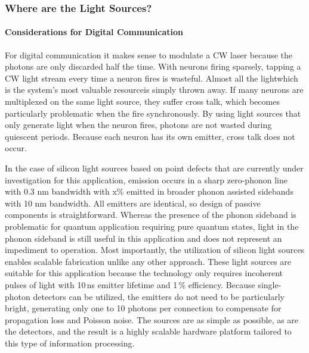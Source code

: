 \subsubsection{Where are the Light Sources?}

\paragraph{Considerations for Digital Communication}
\vspace{3em}
For digital communication it makes sense to modulate a CW laser because the photons are only discarded half the time. With neurons firing sparsely, tapping a CW light stream every time a neuron fires is wasteful. Almost all the light\textemdash which is the system's most valuable resource\textemdash is simply thrown away. If many neurons are multiplexed on the same light source, they suffer cross talk, which becomes particularly problematic when the fire synchronously. By using light sources that only generate light when the neuron fires, photons are not wasted during quiescent periods. Because each neuron has its own emitter, cross talk does not occur. 

In the case of silicon light sources based on point defects that are currently under investigation for this application, emission occurs in a sharp zero-phonon line with 0.3 nm bandwidth with x\% emitted in broader phonon assisted sidebands with 10 nm bandwidth. All emitters are identical, so design of passive components is straightforward. Whereas the presence of the phonon sideband is problematic for quantum application requiring pure quantum states, light in the phonon sideband is still useful in this application and does not represent an impediment to operation. Most importantly, the utilization of silicon light sources enables scalable fabrication unlike any other approach. These light sources are suitable for this application because the technology only requires incoherent pulses of light with 10\,ns emitter lifetime and 1\,\% efficiency. Because single-photon detectors can be utilized, the emitters do not need to be particularly bright, generating only one to 10 photons per connection to compensate for propagation loss and Poisson noise. The sources are as simple as possible, as are the detectors, and the result is a highly scalable hardware platform tailored to this type of information processing.


